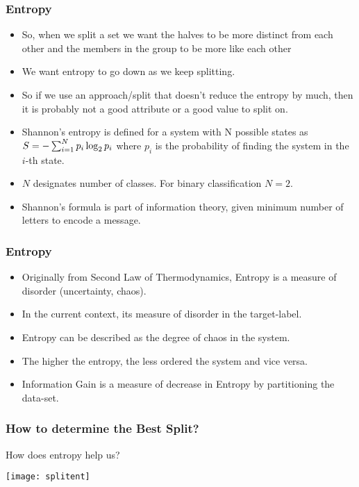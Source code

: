 \begin{frame}[fragile]\frametitle{Entropy}
\begin{itemize}
\item So, when we split a set we want the halves to be more distinct from each other and the members in the group to be more like each other
\item We want entropy to go down as we keep splitting.
\item So if we use an approach/split that doesn't reduce the entropy by much, then it is probably not a good attribute or a good value to split on.
\item Shannon's entropy is defined for a system with N possible states as 
$\Large S = -\sum_{i=1}^{N}p_i \log_2{p_i}$  where $p_i$  is the probability of finding the system in the  $i$-th state.
\item $N$ designates number of classes. For binary classification $N=2$.
\item Shannon's formula is part of information theory, given minimum number of letters to encode a message.
\end{itemize}
\end{frame}

\begin{frame}[fragile]\frametitle{Entropy}
\begin{itemize}
\item Originally from Second Law of Thermodynamics, Entropy is a measure of disorder (uncertainty, chaos).
\item In the current context, its measure of disorder in the target-label.
\item  Entropy can be described as the degree of chaos in the system.
\item The higher the entropy, the less ordered the system and vice versa.
\item Information Gain is a measure of decrease in Entropy by partitioning the data-set.
\end{itemize}
\end{frame}

\begin{frame}[fragile]\frametitle{How to determine the Best Split?}
How does entropy help us?

\begin{center}
\texttt{[image: splitent]}
\end{center}
\end{frame}


